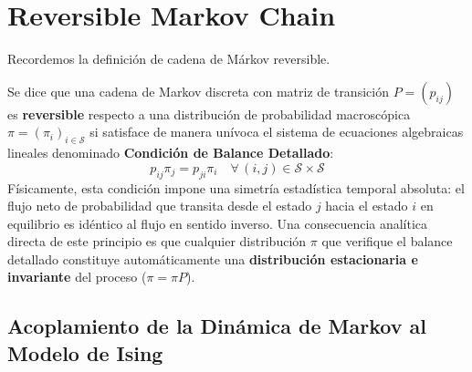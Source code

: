 \section{Reversible Markov Chain}
Recordemos la definición de cadena de Márkov reversible.
\begin{definicion}
    Se dice que una cadena de Markov discreta con matriz de transición $P = (p_{ij})$ es \textbf{reversible} respecto a una distribución de probabilidad macroscópica $\pi = (\pi_i)_{i \in \mathcal{S}}$ si satisface de manera unívoca el sistema de ecuaciones algebraicas lineales denominado \textbf{Condición de Balance Detallado}:
    \[
    p_{ij} \pi_j = p_{ji} \pi_i \quad \forall \, (i,j) \in \mathcal{S} \times \mathcal{S}
    \]
    Físicamente, esta condición impone una simetría estadística temporal absoluta: el flujo neto de probabilidad que transita desde el estado $j$ hacia el estado $i$ en equilibrio es idéntico al flujo en sentido inverso. Una consecuencia analítica directa de este principio es que cualquier distribución $\pi$ que verifique el balance detallado constituye automáticamente una \textbf{distribución estacionaria e invariante} del proceso ($\pi = \pi P$).
\end{definicion}

\subsection{Acoplamiento de la Dinámica de Markov al Modelo de Ising}

